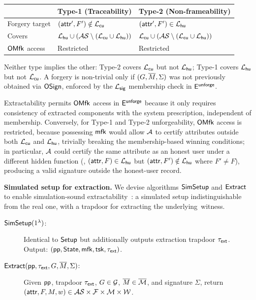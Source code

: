 \begin{center}\footnotesize
\begin{tabular}{@{} l | l | l @{}}
\hline
& \textbf{Type-1 (Traceability)} & \textbf{Type-2 (Non-frameability)}
\\
\hline
Forgery target
	& $(\mathsf{attr}', F') \notin \mathcal{L}_\mathsf{cu}$
	& $(\mathsf{attr}', F') \in \mathcal{L}_\mathsf{hu}$
	\\
Covers
	& $\mathcal{L}_\mathsf{hu} \cup (\mathcal{AS} \setminus (\mathcal{L}_\mathsf{cu} \cup \mathcal{L}_\mathsf{hu}))$
	& $\mathcal{L}_\mathsf{cu} \cup (\mathcal{AS} \setminus (\mathcal{L}_\mathsf{cu} \cup \mathcal{L}_\mathsf{hu}))$
	\\
$\mathsf{OMfk}$ access
	& Restricted & Restricted
	\\
\hline
\end{tabular}
\end{center}

Neither type implies the other:
Type-2 covers $\mathcal{L}_\mathsf{cu}$ but not $\mathcal{L}_\mathsf{hu}$;
Type-1 covers $\mathcal{L}_\mathsf{hu}$ but not $\mathcal{L}_\mathsf{cu}$.
A forgery is non-trivial only if $(G, \overline{M}, \Sigma)$ was not previously
obtained via $\mathsf{OSign}$, enforced by the $\mathcal{L}_\mathsf{sig}$ membership check in $\mathsf{E}^{\mathsf{unforge}}$.

Extractability permits $\mathsf{OMfk}$ access in $\mathsf{E}^{\mathsf{unforge}}$ because it only requires consistency of extracted components with the system prescription, independent of membership.
Conversely, for Type-1 and \mbox{Type-2} unforgeability, $\mathsf{OMfk}$ access is restricted,
because possessing $\mathsf{mfk}$ would allow $\mathcal{A}$ to certify attributes outside both $\mathcal{L}_\mathsf{cu}$ and $\mathcal{L}_\mathsf{hu}$, trivially breaking the membership-based winning conditions;
in particular, $\mathcal{A}$ could certify the same attribute as an honest user
under a different hidden function
(\eg, $(\mathsf{attr}, F) \in \mathcal{L}_\mathsf{hu}$ but $(\mathsf{attr}, F') \notin \mathcal{L}_\mathsf{hu}$ where $F' \neq F$),
producing a valid signature outside the honest-user record.

\medskip
\noindent\textbf{Simulated setup for extraction.}
We devise algorithms $\mathsf{SimSetup}$ and $\mathsf{Extract}$
to enable simulation-sound extractability~\cite{CRYPTO:ChaLys06}:
a simulated setup indistinguishable from the real one,
with a trapdoor for extracting the underlying~witness.

\begin{definition}%
\label{definition:sms-additional-algorithms}
\begin{description}
\item[$\mathsf{SimSetup}(1^\lambda)$:]
Identical to $\mathsf{Setup}$ but additionally outputs extraction trapdoor $\tau_\mathsf{ext}$.
Output: $(\mathsf{pp}, \mathsf{State}, \mathsf{mfk}, \mathsf{tsk}, \tau_\mathsf{ext})$.

\item[$\mathsf{Extract}(\mathsf{pp}, \tau_\mathsf{ext}, G, \overline{M}, \Sigma)$:]
Given $\mathsf{pp}$, trapdoor $\tau_\mathsf{ext}$, $G \in \mathcal{G}$,
$\overline{M} \in \overline{\mathcal{M}}$, and signature $\Sigma$,
return $(\mathsf{attr}, F, M, w) \in
\mathcal{AS} \times \mathcal{F} \times \mathcal{M} \times \mathcal{W}$.
\end{description}
\end{definition}

